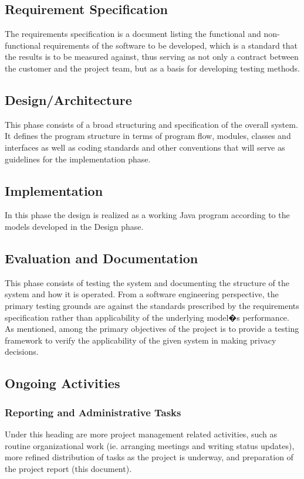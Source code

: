 \subsection{Requirement Specification}
The requirements specification is a document listing the functional and non-functional requirements of the software to be developed, which is a standard that the results is to be measured against, thus serving as not only a contract between the customer and the project team, but as a basis for developing testing methods.

\subsection{Design/Architecture}
This phase consists of a broad structuring and specification of the overall system. It defines the program structure in terms of program flow, modules, classes and interfaces as well as coding standards and other conventions that will serve as guidelines for the implementation phase.

\subsection{Implementation}
In this phase the design is realized as a working Java program according to the models developed in the Design phase. 

\subsection{Evaluation and Documentation}
This phase consists of testing the system and documenting the structure of the system and how it is operated. From a software engineering perspective, the primary testing grounds are against the standards prescribed by the requirements specification rather than applicability of the underlying model�s performance. As mentioned, among the primary objectives of the project is to provide a testing framework to verify the applicability of the given system in making privacy decisions.

\subsection{Ongoing Activities}

\subsubsection{Reporting and Administrative Tasks}
Under this heading are more project management related activities, such as routine organizational work (ie. arranging meetings and writing status updates), more refined distribution of tasks as the project is underway, and preparation of the project report (this document).

